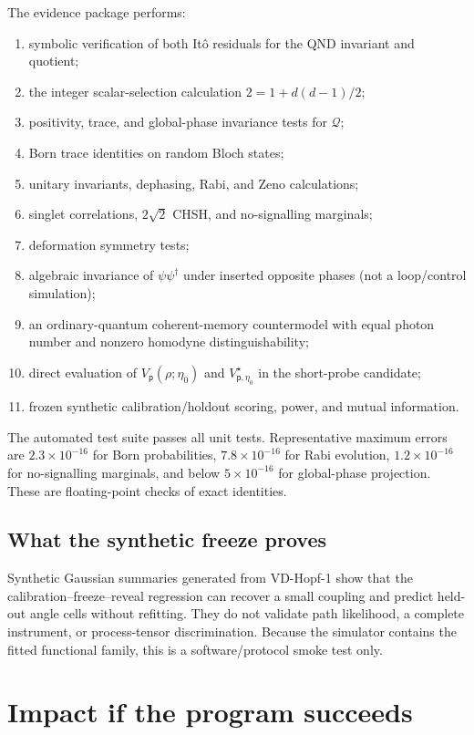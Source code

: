 \documentclass[10pt]{article}
\theoremstyle{definition}
\theoremstyle{remark}
\newcommand{\cQ}{\mathcal Q}
\begin{document}
The evidence package performs:
\begin{enumerate}
\item symbolic verification of both It\^o residuals for the QND invariant and quotient;
\item the integer scalar-selection calculation \(2=1+d(d-1)/2\);
\item positivity, trace, and global-phase invariance tests for \(\cQ\);
\item Born trace identities on random Bloch states;
\item unitary invariants, dephasing, Rabi, and Zeno calculations;
\item singlet correlations, \(2\sqrt2\) CHSH, and no-signalling marginals;
\item deformation symmetry tests;
\item algebraic invariance of \(\psi\psi^\dagger\) under inserted opposite phases (not a loop/control simulation);
\item an ordinary-quantum coherent-memory countermodel with equal photon number and nonzero homodyne distinguishability;
\item direct evaluation of \(V_{\mathsf p}(\rho;\eta_0)\) and \(V^\star_{\mathsf p,\eta_0}\) in the short-probe candidate;
\item frozen synthetic calibration/holdout scoring, power, and mutual information.
\end{enumerate}

The automated test suite passes all unit tests. Representative maximum errors are \(2.3\times10^{-16}\) for Born probabilities, \(7.8\times10^{-16}\) for Rabi evolution, \(1.2\times10^{-16}\) for no-signalling marginals, and below \(5\times10^{-16}\) for global-phase projection. These are floating-point checks of exact identities.

\subsection{What the synthetic freeze proves}

Synthetic Gaussian summaries generated from VD-Hopf-1 show that the calibration--freeze--reveal regression can recover a small coupling and predict held-out angle cells without refitting. They do not validate path likelihood, a complete instrument, or process-tensor discrimination. Because the simulator contains the fitted functional family, this is a software/protocol smoke test only.

\section{Impact if the program succeeds}
\end{document}
